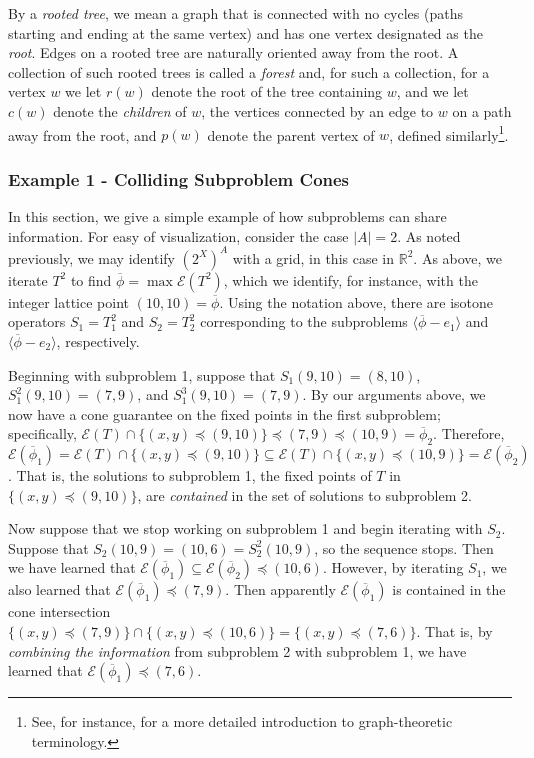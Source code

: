 \documentclass[11pt,reqno]{amsart}
\theoremstyle{definition}
\numberwithin{equation}{section}
\newcommand{\mr}{\mathbb{R}}
\newcommand{\ol}{\overline}
\newcommand{\lag}{\langle}
\newcommand{\rag}{\rangle}
\newcommand{\pre}{\phi}
\newcommand{\prealloc}{(2^X)^A}
\newcommand{\sub}{\subseteq}
\newcommand{\fix}{\mathcal{E}}
\newcommand{\peq}{\preceq}
\newcommand{\toppre}{\ol{\pre}}
\begin{document}
By a \emph{rooted tree}, we mean a graph that is connected with no cycles (paths starting and ending at the same vertex) and has one vertex designated as the \emph{root}. 
Edges on a rooted tree are naturally oriented away from the root. 
A collection of such rooted trees is called a \emph{forest} and, for such a collection, for a vertex $w$ we let $r(w)$ denote the root of the tree containing $w$, and we let $c(w)$ denote the \emph{children} of $w$, the vertices connected by an edge to $w$ on a path away from the root, and $p(w)$ denote the parent vertex of $w$, defined similarly\footnote{See, for instance, \cite{GrossYellen2005graph} for a more detailed introduction to graph-theoretic terminology.}.

\subsubsection{Example 1 - Colliding Subproblem Cones}
In this section, we give a simple example of how subproblems can share information.
For easy of visualization, consider the case $|A| = 2$. As noted previously, we may identify $\prealloc$ with a grid, in this case in $\mr^2$.
As above, we iterate $T^2$ to find $\toppre = \max \fix(T^2)$, which we identify, for instance, with the integer lattice point $(10,10) = \toppre$. 
Using the notation above, there are isotone operators $S_1 = T_1^2$ and $S_2 = T_2^2$ corresponding to the subproblems $\lag \toppre - e_1 \rag$ and $\lag \toppre - e_2 \rag$, respectively. 

Beginning with subproblem 1, suppose that $S_1 (9,10) = (8,10)$, $S_1^2 (9,10) = (7,9)$, and $S_1^3 (9,10) = (7,9)$.
By our arguments above, we now have a cone guarantee on the fixed points in the first subproblem; specifically, $\fix(T) \cap \{(x,y) \peq (9,10)\} \peq (7,9) \peq (10,9) = \toppre_2$.
Therefore, $\fix(\toppre_1) = \fix(T) \cap \{(x,y) \peq (9,10)\} \sub \fix(T) \cap \{(x,y) \peq (10,9)\} = \fix(\toppre_2)$. 
That is, the solutions to subproblem 1, the fixed points of $T$ in $\{(x,y) \peq (9,10)\}$, are \emph{contained} in the set of solutions to subproblem 2. 

Now suppose that we stop working on subproblem 1 and begin iterating with $S_2$.
Suppose that $S_2(10,9) = (10,6) = S_2^2(10,9)$, so the sequence stops.
Then we have learned that $\fix(\toppre_1) \sub \fix(\toppre_2) \peq (10,6)$. 
However, by iterating $S_1$, we also learned that $\fix(\toppre_1) \peq (7,9)$. 
Then apparently $\fix(\toppre_1)$ is contained in the cone intersection $\{(x,y) \peq (7,9)\} \cap \{(x,y) \peq (10, 6)\} = \{(x,y) \peq (7,6) \}$. 
That is, by \emph{combining the information} from subproblem 2 with subproblem 1, we have learned that $\fix(\toppre_1) \peq (7,6)$. 
\end{document}
